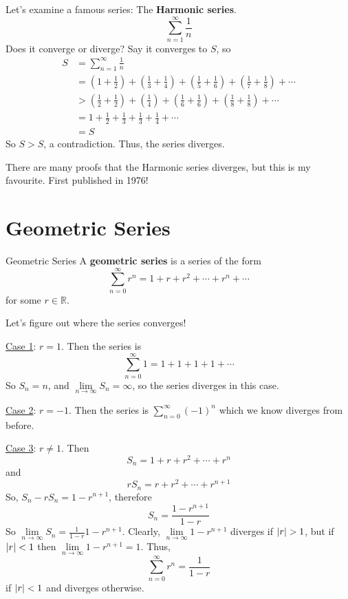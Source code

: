 Let's examine a famous series: The \textbf{Harmonic series}.
\[ \sum\limits_{n=1}^{\infty}\frac{1}{n} \]
Does it converge or diverge? Say it converges to $ S $, so
\begin{align*}
    S
     & =\sum\limits_{n=1}^{\infty} \frac{1}{n}                                              \\
     & =\left( 1+\frac{1}{2} \right)+\left( \frac{1}{3} +\frac{1}{4} \right)+
    \left( \frac{1}{5} +\frac{1}{6} \right)+\left( \frac{1}{7} +\frac{1}{8}  \right)+\cdots \\
     & >\left( \frac{1}{2} +\frac{1}{2}  \right)+\left( \frac{1}{4}  \right) +
    \left( \frac{1}{6}+\frac{1}{6} \right)+\left( \frac{1}{8} +\frac{1}{8}  \right)+\cdots  \\
     & =1+\frac{1}{2} +\frac{1}{3} +\frac{1}{3} +\frac{1}{4} +\cdots                        \\
     & =S
\end{align*}
So $ S>S $, a contradiction. Thus, the series diverges.

\begin{Remark}{}{}
    There are many proofs that the Harmonic series diverges, but this is my favourite.
    First published in 1976!
\end{Remark}

\section{Geometric Series}
\begin{Definition}{Geometric Series}{}
    A \textbf{geometric series} is a series of the form
    \[ \sum\limits_{n=0}^{\infty} r^n=1+r+r^2+\cdots+r^n+\cdots \]
    for some $ r\in\mathbb{R} $.
\end{Definition}
Let's figure out where the series converges!

\underline{Case 1}: $ r=1 $. Then the series is
\[ \sum\limits_{n=0}^{\infty} 1=1+1+1+1+\cdots \]
So $ S_n=n $, and $ \lim\limits_{{n} \to {\infty}} S_n =\infty $, so the series
diverges in this case.

\underline{Case 2}: $ r=-1 $. Then the series is $ \sum\limits_{n=0}^{\infty} (-1)^n $
which we know diverges from before.

\underline{Case 3}: $ r\neq 1 $. Then
\[ S_n=1+r+r^2+\cdots+r^n \]
and
\[ rS_n=r+r^2+\cdots+r^{n+1} \]
So, $ S_n-rS_n=1-r^{n+1} $, therefore
\[ S_n=\frac{1-r^{n+1}}{1-r} \]
So $ \lim\limits_{{n} \to {\infty}} S_n=\frac{1}{1-r} 1-r^{n+1} $.
Clearly, $ \lim\limits_{{n} \to {\infty}} 1-r^{n+1} $ diverges if $ \lvert r\rvert>1 $,
but if $ \lvert r\rvert<1 $ then $ \lim\limits_{{n} \to {\infty}} 1-r^{n+1}=1 $.
Thus,
\[ \sum\limits_{n=0}^{\infty} r^n=\frac{1}{1-r} \]
if $ \lvert r\rvert<1 $ and diverges otherwise.

